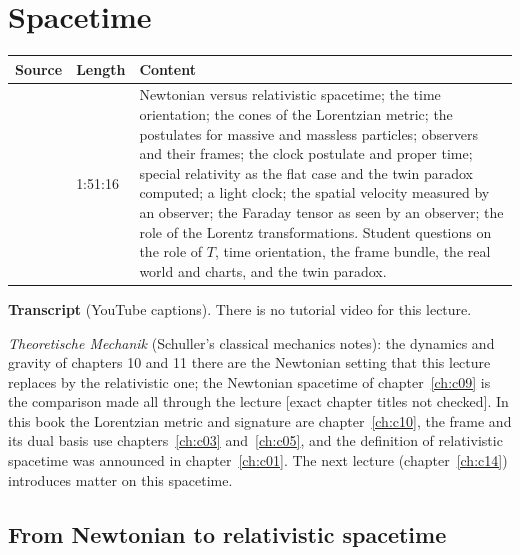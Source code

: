 \chapter{Spacetime}\label{ch:c13}
\begin{paracol}{2}

\begin{sources}
\begin{tabularx}{\linewidth}{@{}l l L@{}}
\toprule
\textbf{Source} & \textbf{Length} & \textbf{Content}\\
\midrule
{} & 1:51:16 & Newtonian versus relativistic spacetime; the time orientation; the cones of the Lorentzian metric; the postulates for massive and massless particles; observers and their frames; the clock postulate and proper time; special relativity as the flat case and the twin paradox computed; a light clock; the spatial velocity measured by an observer; the Faraday tensor as seen by an observer; the role of the Lorentz transformations. Student questions on the role of $T$, time orientation, the frame bundle, the real world and charts, and the twin paradox.\\
\bottomrule
\end{tabularx}

\smallskip
\textbf{Transcript}  (YouTube captions). There is no tutorial video for this lecture.
\end{sources}

\begin{reading}
\emph{Theoretische Mechanik} (Schuller's classical mechanics notes): the dynamics and gravity of chapters 10 and 11 there are the Newtonian setting that this lecture replaces by the relativistic one; the Newtonian spacetime of chapter~\ref{ch:c09} is the comparison made all through the lecture [exact chapter titles not checked]. In this book the Lorentzian metric and signature are chapter~\ref{ch:c10}, the frame and its dual basis use chapters~\ref{ch:c03} and~\ref{ch:c05}, and the definition of relativistic spacetime was announced in chapter~\ref{ch:c01}. The next lecture (chapter~\ref{ch:c14}) introduces matter on this spacetime.
\end{reading}

\section{From Newtonian to relativistic spacetime}\label{sec:c13-newton}


\end{paracol}
